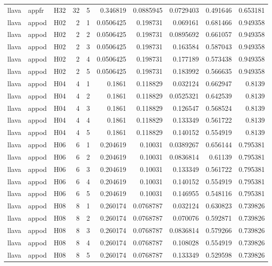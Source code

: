 \begin{longtable}{lllrrrrrrr}
llava & appfr & H32 & 32 & 5 & 0.346819 & 0.0885945 & 0.0729403 & 0.491646 & 0.653181 \\
llava & appod & H02 & 2 & 1 & 0.0506425 & 0.198731 & 0.069161 & 0.681466 & 0.949358 \\
llava & appod & H02 & 2 & 2 & 0.0506425 & 0.198731 & 0.0895692 & 0.661057 & 0.949358 \\
llava & appod & H02 & 2 & 3 & 0.0506425 & 0.198731 & 0.163584 & 0.587043 & 0.949358 \\
llava & appod & H02 & 2 & 4 & 0.0506425 & 0.198731 & 0.177189 & 0.573438 & 0.949358 \\
llava & appod & H02 & 2 & 5 & 0.0506425 & 0.198731 & 0.183992 & 0.566635 & 0.949358 \\
llava & appod & H04 & 4 & 1 & 0.1861 & 0.118829 & 0.032124 & 0.662947 & 0.8139 \\
llava & appod & H04 & 4 & 2 & 0.1861 & 0.118829 & 0.0525321 & 0.642539 & 0.8139 \\
llava & appod & H04 & 4 & 3 & 0.1861 & 0.118829 & 0.126547 & 0.568524 & 0.8139 \\
llava & appod & H04 & 4 & 4 & 0.1861 & 0.118829 & 0.133349 & 0.561722 & 0.8139 \\
llava & appod & H04 & 4 & 5 & 0.1861 & 0.118829 & 0.140152 & 0.554919 & 0.8139 \\
llava & appod & H06 & 6 & 1 & 0.204619 & 0.10031 & 0.0389267 & 0.656144 & 0.795381 \\
llava & appod & H06 & 6 & 2 & 0.204619 & 0.10031 & 0.0836814 & 0.61139 & 0.795381 \\
llava & appod & H06 & 6 & 3 & 0.204619 & 0.10031 & 0.133349 & 0.561722 & 0.795381 \\
llava & appod & H06 & 6 & 4 & 0.204619 & 0.10031 & 0.140152 & 0.554919 & 0.795381 \\
llava & appod & H06 & 6 & 5 & 0.204619 & 0.10031 & 0.146955 & 0.548116 & 0.795381 \\
llava & appod & H08 & 8 & 1 & 0.260174 & 0.0768787 & 0.032124 & 0.630823 & 0.739826 \\
llava & appod & H08 & 8 & 2 & 0.260174 & 0.0768787 & 0.070076 & 0.592871 & 0.739826 \\
llava & appod & H08 & 8 & 3 & 0.260174 & 0.0768787 & 0.0836814 & 0.579266 & 0.739826 \\
llava & appod & H08 & 8 & 4 & 0.260174 & 0.0768787 & 0.108028 & 0.554919 & 0.739826 \\
llava & appod & H08 & 8 & 5 & 0.260174 & 0.0768787 & 0.133349 & 0.529598 & 0.739826 \\

\end{longtable}
